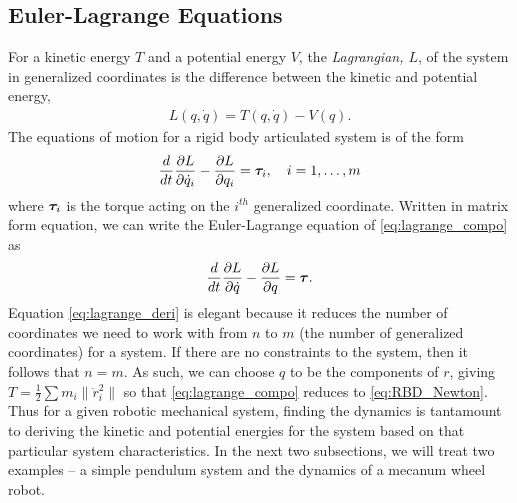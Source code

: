 \subsection{Euler-Lagrange Equations}
%
For a kinetic energy $T$ and a potential energy $V$, the \textit{Lagrangian, $L$}, of the system in generalized coordinates is the difference between the kinetic and potential energy, \ie
%
\begin{align}
L(q, \dot{q}) = T(q, \dot{q}) - V(q).
\label{eq:lagrange}
\end{align}
%
The equations of motion for a rigid body articulated system is of the form
%
\begin{align}
\dfrac{d}{dt}\dfrac{\partial L}{\partial \dot{q}_i} - \dfrac{\partial L}{\partial q_i} = \bm{\tau}_i, \quad i = 1, \ldots, m
\label{eq:lagrange_compo}
\end{align}
%
where $\bm{\tau}_i$ is the torque acting on the $i^{th}$ generalized coordinate. Written in matrix form equation, we can write the Euler-Lagrange equation of \eqref{eq:lagrange_compo} as
%
\begin{align}
\dfrac{d}{dt}\dfrac{\partial L}{\partial \dot{q}} - \dfrac{\partial L}{\partial q} = \bm{\tau}.
\label{eq:lagrange_deri}
\end{align}
%
Equation \eqref{eq:lagrange_deri} is elegant because it reduces the number of coordinates we need to work with from $n$ to $m$ (the number of generalized coordinates) for a system. If there are no constraints to the system, then it follows that $n=m$. As such, we can choose $q$ to be the components of $r$, giving $T=\frac{1}{2}\sum m_i \|\ddot{r}_i^2\|$ so that \eqref{eq:lagrange_compo} reduces to \eqref{eq:RBD_Newton}.
%
Thus for a given robotic mechanical system, finding the dynamics is tantamount to deriving the kinetic and potential energies for the system based on that particular system characteristics. In the next two subsections, we will treat two examples -- a simple pendulum system and the dynamics of a mecanum wheel robot. 


